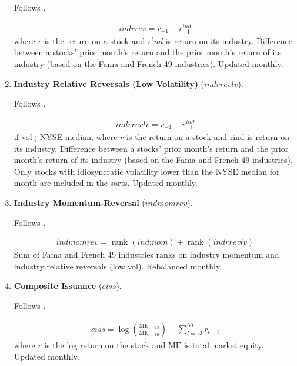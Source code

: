 \begin{enumerate}
	Follows . 
	
	\begin{align*}
		indrrev = r_{-1} - r^{ind}_{-1}
	\end{align*}
	where $r$ is the return on a stock and $r^ind$ is return on its industry. Difference between a stocks' prior month's return and the prior month's return of its industry (based on the Fama and French 49 industries). Updated monthly.
	
	
	
	\item \textbf{Industry Relative Reversals (Low Volatility)} ($indrrevlv$). 
	
	Follows . 
	
	\begin{align*}
		indrrevlv = r_{-1} - r^{ind}_{-1}
	\end{align*}
	if vol ¡ NYSE median, where $r$ is the return on a
	stock and rind is return on its industry. Difference between a stocks' prior month's return and the prior month's return of its industry (based on the Fama and French 49 industries). Only stocks with idiosyncratic volatility lower than the NYSE median for month are included in the sorts. Updated monthly.
	
	
	
	\item \textbf{Industry Momentum-Reversal} ($indmomrev$). 
	
	Follows . 
	
	\begin{align*}
		indmomrev = \operatorname{rank}(indmom) + \operatorname{rank}(indrrevlv)
	\end{align*}
	Sum of Fama and French 49 industries ranks on industry momentum and industry relative reversals (low vol). Rebalanced monthly.
	
	
	
	\item \textbf{Composite Issuance} ($ciss$). 
	
	Follows . 
	
	\begin{align*}
		ciss = \log\left( \frac{ \mathrm{ME}_{t-13} }{ \mathrm{ME}_{t-60} } \right) - \sum^60_{l=13} r_{t-l}
	\end{align*}
	where $r$ is the log return on the stock and $\mathrm{ME}$ is total market equity. Updated monthly.
	
	
	

\end{enumerate}
